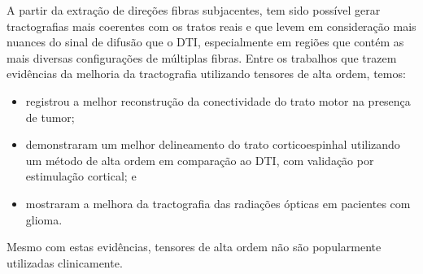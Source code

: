 \documentclass[
    12pt,                %
    oneside,            %
    a4paper,            %
    english,            %
    french,                %
    spanish,            %
    brazil                %
    ]{abntex2}
\begin{document}



A partir da extração de direções fibras subjacentes, tem sido possível gerar tractografias mais coerentes com os tratos reais e que levem em consideração mais nuances do sinal de difusão que o DTI, especialmente em regiões que contém as mais diversas configurações de múltiplas fibras. Entre os trabalhos que trazem evidências da melhoria da tractografia utilizando tensores de alta ordem, temos:

\begin{itemize}
    \item {} registrou a melhor reconstrução da conectividade do trato motor na presença de tumor;
    \item {} demonstraram um melhor delineamento do trato corticoespinhal utilizando um método de alta ordem em comparação ao DTI, com validação por estimulação cortical; e
    \item {} mostraram a melhora da tractografia das radiações ópticas em pacientes com glioma.
\end{itemize}
Mesmo com estas evidências, tensores de alta ordem não são popularmente utilizadas clinicamente.


\end{document}
